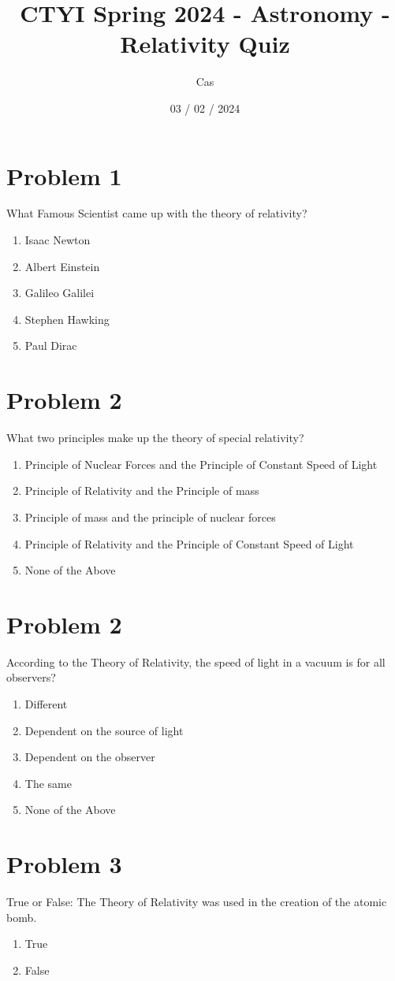\documentclass{article}
\title{CTYI Spring 2024 - Astronomy - Relativity Quiz}
\author{Cas}
\date{03 / 02 / 2024}
\begin{document}
\maketitle

\section*{Problem 1}
What Famous Scientist came up with the theory of relativity?
\begin{enumerate}
    \item Isaac Newton
    \item Albert Einstein
    \item Galileo Galilei
    \item Stephen Hawking
    \item Paul Dirac
\end{enumerate}
\section*{Problem 2}
What two principles make up the theory of special relativity?
\begin{enumerate}
    \item Principle of Nuclear Forces and the Principle of Constant Speed of Light
    \item Principle of Relativity and the Principle of mass
    \item Principle of mass and the principle of nuclear forces
    \item Principle of Relativity and the Principle of Constant Speed of Light
    \item None of the Above
\end{enumerate}
\section*{Problem 2}
According to the Theory of Relativity, the speed of light in a vacuum is \underline{\hspace{3cm}} for all observers?
\begin{enumerate}
    \item Different
    \item Dependent on the source of light
    \item Dependent on the observer
    \item The same
    \item None of the Above
\end{enumerate}
\section*{Problem 3}
True or False: The Theory of Relativity was used in the creation of the atomic bomb.
\begin{enumerate}
    \item True
    \item False
\end{enumerate}
\end{document}
